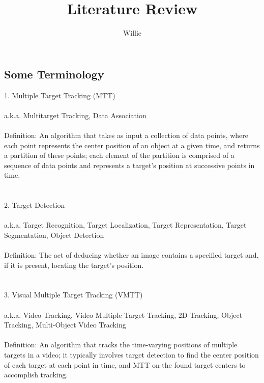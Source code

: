 \documentclass{article}
\begin{document}
\title{Literature Review}
\author{Willie}
\maketitle
\mbox{}



\subsection*{Some Terminology}
\vspace{6pt}
1. Multiple Target Tracking (MTT) \\
\\
a.k.a. Multitarget Tracking, Data Association \\
\\
Definition: An algorithm that takes as input a collection of data points, where each point represents the center position of an object at a given time, and returns a partition of these points; each element of the partition is comprised of a sequence of data points and represents a target's position at successive points in time. \\
\\
\\
2. Target Detection \\
\\
a.k.a. Target Recognition, Target Localization, Target Representation, Target Segmentation, Object Detection \\
\\
Definition: The act of deducing whether an image contains a specified target and, if it is present, locating the target's position. \\
\\
\\
3. Visual Multiple Target Tracking (VMTT) \\
\\
a.k.a. Video Tracking, Video Multiple Target Tracking, 2D Tracking, Object Tracking, Multi-Object Video Tracking \\
\\
Definition: An algorithm that tracks the time-varying positions of multiple targets in a video; it typically involves target detection to find the center position of each target at each point in time, and MTT on the found target centers to accomplish tracking.
\\
\\
\end{document}
